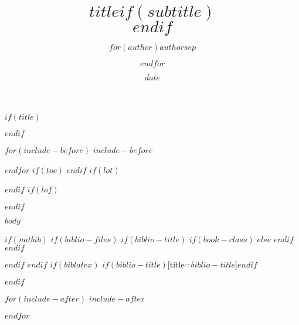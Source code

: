 \documentclass[$if(fontsize)$$fontsize$,$endif$$if(lang)$$lang$,$endif$$if(papersize)$$papersize$,$endif$$for(classoption)$$classoption$$sep$,$endfor$]{$documentclass$}
\title{$title$$if(subtitle)$\\\vspace{0.5em}{\large $subtitle$}$endif$}
\author{$for(author)$$author$$sep$ \and $endfor$}
\date{$date$}
\begin{document}


$if(title)$
\maketitle
$endif$


$for(include-before)$
$include-before$

$endfor$
$if(toc)$
{
\setcounter{tocdepth}{1}%
\tableofcontents
}
$endif$
$if(lot)$
\listoftables
$endif$
$if(lof)$
\listoffigures
$endif$

$body$

$if(natbib)$
$if(biblio-files)$
$if(biblio-title)$
$if(book-class)$
\renewcommand\bibname{$biblio-title$}
$else$
\renewcommand\refname{$biblio-title$}
$endif$
$endif$


$endif$
$endif$
$if(biblatex)$
\printbibliography$if(biblio-title)$[title=$biblio-title$]$endif$

$endif$

$for(include-after)$
$include-after$

$endfor$


\end{document}
